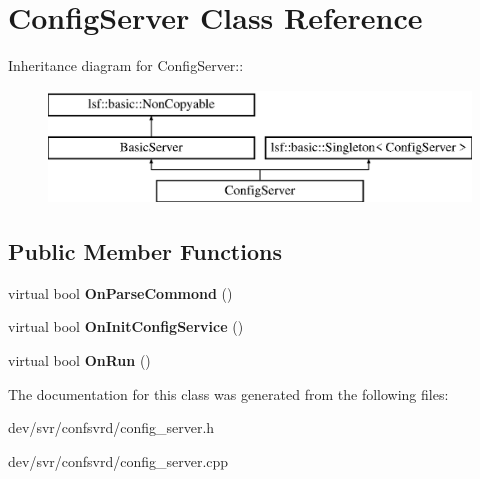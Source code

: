 \hypertarget{classConfigServer}{
\section{ConfigServer Class Reference}
\label{classConfigServer}
}
Inheritance diagram for ConfigServer::\begin{figure}[H]
\begin{center}
\leavevmode
\includegraphics[height=3cm]{classConfigServer}
\end{center}
\end{figure}
\subsection*{Public Member Functions}
\begin{DoxyCompactItemize}
\item 
\hypertarget{classConfigServer_a896368570faff772abddf6ed68e3fbd9}{
virtual bool {\bfseries OnParseCommond} ()}
\label{classConfigServer_a896368570faff772abddf6ed68e3fbd9}

\item 
\hypertarget{classConfigServer_ad52b19f6ea078732afe3080258841704}{
virtual bool {\bfseries OnInitConfigService} ()}
\label{classConfigServer_ad52b19f6ea078732afe3080258841704}

\item 
\hypertarget{classConfigServer_a081e05ed78d63c67ecb537eb360dea74}{
virtual bool {\bfseries OnRun} ()}
\label{classConfigServer_a081e05ed78d63c67ecb537eb360dea74}

\end{DoxyCompactItemize}


The documentation for this class was generated from the following files:\begin{DoxyCompactItemize}
\item 
dev/svr/confsvrd/config\_\-server.h\item 
dev/svr/confsvrd/config\_\-server.cpp\end{DoxyCompactItemize}
